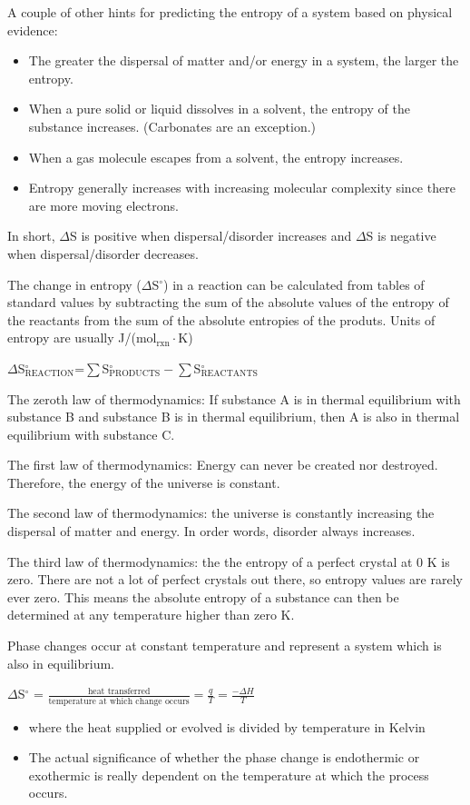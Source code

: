 \documentclass[../chem.tex]{subfiles}
\begin{document}
A couple of other hints for predicting the entropy of a system based on physical evidence:
\begin{itemize}
    \item The greater the dispersal of matter and/or energy in a system, the larger the entropy.
    \item When a pure solid or liquid dissolves in a solvent, the entropy of the substance increases. (Carbonates are an exception.)
    \item When a gas molecule escapes from a solvent, the entropy increases.
    \item Entropy generally increases with increasing molecular complexity since there are more moving electrons.
\end{itemize}

In short, $\Delta$S is positive when dispersal/disorder increases and $\Delta$S is negative when dispersal/disorder decreases.

The change in entropy ($\Delta$S$^{\circ}$) in a reaction can be calculated from tables of standard values by subtracting the sum of the absolute values 
of the entropy of the reactants from the sum of the absolute entropies of the produts. Units of entropy are usually J/(mol$_{\text{rxn}}\cdot$K)
\begin{center}
    $\Delta$S$^{\circ}_{\text{REACTION}}$=$\sum$S$^{\circ}_{\text{PRODUCTS}}-\sum$S$^{\circ}_{\text{REACTANTS}}$
\end{center}

The zeroth law of thermodynamics: If substance A is in thermal equilibrium with substance B and substance B is in thermal equilibrium, then A is also in thermal equilibrium with substance C.

The first law of thermodynamics: Energy can never be created nor destroyed. Therefore, the energy of the universe is constant. 

The second law of thermodynamics: the universe is constantly increasing the dispersal of matter and energy. In order words, disorder always increases.

The third law of thermodynamics: the the entropy of a perfect crystal at 0 K is zero. There are not a lot of perfect crystals out there, so 
entropy values are rarely ever zero. This means the absolute entropy of a substance can then be determined at any temperature higher than zero K.

Phase changes occur at constant temperature and represent a system which is also in equilibrium.
\begin{center}
    $\Delta$S$^{\circ}$ = $\frac{\text{heat transferred}}{\text{temperature at which change occurs}} = \frac{q}{T}=\frac{-\Delta H}{T}$
\end{center}
\begin{itemize}
    \item where the heat supplied or evolved is divided by temperature in Kelvin
    \item The actual significance of whether the phase change is endothermic or exothermic is really dependent on the temperature at which the process occurs.
\end{itemize}
\end{document}

